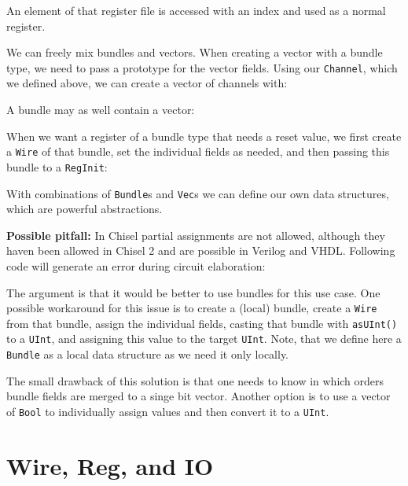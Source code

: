 \documentclass[%
    10pt,
    headinclude, footexclude,
    openright, %
    notitlepage,
    cleardoubleempty,
    headsepline,
    pointlessnumbers,
    bibtotoc, idxtotoc,
    ]{scrbook}
\newcommand{\code}[1]{{\small{\texttt{#1}}}}
\begin{document}

\noindent An element of that register file is accessed with an index and used as a normal register.


We can freely mix bundles and vectors. When creating a vector with a bundle
type, we need to pass a prototype for the vector fields. Using our
\code{Channel}, which we defined above, we can create a vector of channels with:


\noindent A bundle may as well contain a vector:


When we want a register of a bundle type that needs a reset value,
we first create a \code{Wire} of that bundle, set the individual fields
as needed, and then passing this bundle to a \code{RegInit}:


With combinations of \code{Bundle}s and \code{Vec}s we can define our own data
structures, which are powerful abstractions.

{\bf Possible pitfall:} In Chisel partial assignments are not allowed, although they haven been
allowed in Chisel 2 and are possible in Verilog and VHDL. Following code will generate
an error during circuit elaboration:


\noindent The argument is that it would be better to use bundles for this use case.
One possible workaround for this issue is to create a (local) bundle, create a \code{Wire}
from that bundle, assign the individual fields, casting that bundle with \code{asUInt()}
to a \code{UInt}, and assigning this value to the target \code{UInt}.
Note, that we define here a \code{Bundle} as a local data structure as we need it only
locally.


\noindent The small drawback of this solution is that one needs to know in which orders
bundle fields are merged to a singe bit vector. Another option is to use a vector of \code{Bool}
to individually assign values and then convert it to a \code{UInt}.


\section{Wire, Reg, and IO}
\end{document}
